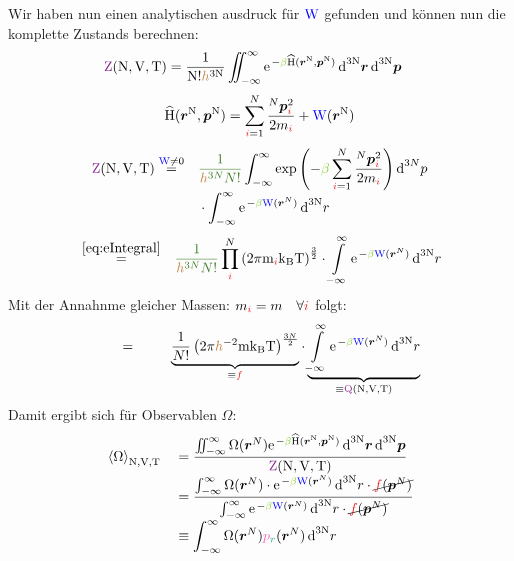 \begin{sectionbox}\nospacing
  Wir haben nun einen analytischen ausdruck für $\textcolor{blue}{\mathrm{W}}$ gefunden und können nun die komplette Zustands berechnen:
  \begin{align*}
    &\Zzk=\frac{1}{\Nz!\hp^{3\Nz}}\iint_{-\infty}^{\infty}\e^{-\betac\Ham(\vec{r}^{\Nz},\vec{p}^{\Nz})}\diff^{3\Nz}\vec{r}\diff^{3\Nz}\vec{p}
  \end{align*}
  \begin{align*}
    \Ham(\vec{r}^{\Nz},\vec{p}^{\Nz})=\sum_{\idxi=1}^{N}\frac{\prescript{N}{}{\pvec}_{\idxi}^2}{2m_{\idxi}}+\Wpot(\vec{r}^{\Nz})
  \end{align*}
  \begin{alignat*}{3}
    \Zzk&\eqs{\Wpot\neq0}&&\mcc[\frac{1}{\hp^{3N}N!}]\int_{-\infty}^{\infty}\exp\left(-\betac\sum_{\idxi=1}^{N}\frac{\prescript{N}{}{\pvec}_{\idxi}^2}{2m_{\idxi}}\right)\diff^{3N}\pimp\nalign
    &&&\cdot\int_{-\infty}^{\infty}\e^{-\betac\Wpot(\rvec^N)}\diff^{3\Nz}r
  \end{alignat*}
  \begin{alignat*}{2}
    &\eqs{\cref{eq:eIntegral}}&\mcc[\frac{1}{\hp^{3N}N!}]\prod_{\idxi}^N \left(2\pi\m_{\idxi}\kb\Tz\right)^{\frac{3}{2}}\cdot\int\limits_{-\infty}^{\infty}\e^{-\betac\Wpot(\rvec^N)}\diff^{3\Nz}r
  \end{alignat*}
  Mit der Annahnme gleicher Massen: $m_{\idxi}=m\quad\forall\idxi$ folgt:
  \begin{align*}
        &\eqs{\hphantom{\cref{eq:eIntegral}}}\underbrace{\frac{1}{N!}\left(2\pi\hp^{-2}\m\kb\Tz\right)^{\frac{3N}{2}}}_{\equiv\tc{ulc1}{f}}\cdot\underbrace{\int\limits_{-\infty}^{\infty}\e^{-\betac\Wpot(\rvec^N)}\diff^{3\Nz}r}_{\equiv\Qzk}
  \end{align*}
  Damit ergibt sich für Observablen $\Omega$:
  \begin{alignat*}{2}
    &\obs{\Omega}_{\Nz,\Vz,\Tz}&&=\frac{\iint_{-\infty}^{\infty}\Omega(\rvec^N)\e^{-\betac\Ham(\vec{r}^{\Nz},\vec{p}^{\Nz})}\diff^{3\Nz}\vec{r}\diff^{3\Nz}\vec{p}}{\Zzk}\nalign
    &&&=\frac{\int_{-\infty}^{\infty}\Omega(\rvec^N)\cdot\e^{-\betac\Wpot(\rvec^N)}\diff^{3\Nz}r\cdot\cancel{\tc{ulc1}{f}(\pvec^N)}}{\int_{-\infty}^{\infty}\e^{-\betac\Wpot(\rvec^N)}\diff^{3\Nz}r\cdot\cancel{\tc{ulc1}{f}(\pvec^N)}}\nalign
    &&&\equiv\int_{-\infty}^{\infty}\Omega(\rvec^N)\pbr(\rvec^N)\diff^{3\Nz}r
  \end{alignat*}
\end{sectionbox}

